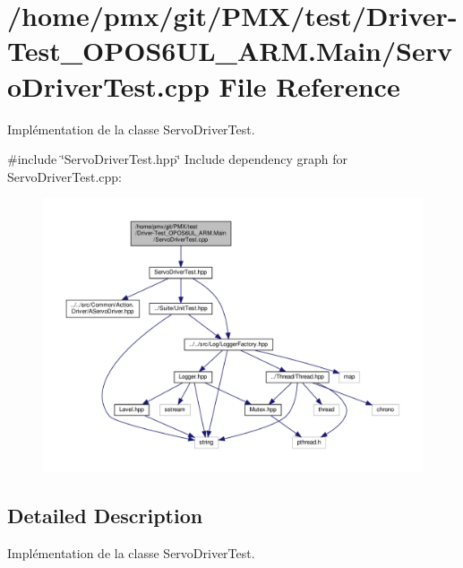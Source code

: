 \hypertarget{Driver-Test__OPOS6UL__ARM_8Main_2ServoDriverTest_8cpp}{}\section{/home/pmx/git/\+P\+M\+X/test/\+Driver-\/\+Test\+\_\+\+O\+P\+O\+S6\+U\+L\+\_\+\+A\+RM.Main/\+Servo\+Driver\+Test.cpp File Reference}
\label{Driver-Test__OPOS6UL__ARM_8Main_2ServoDriverTest_8cpp}


Implémentation de la classe Servo\+Driver\+Test.  


{\ttfamily \#include \char`\"{}Servo\+Driver\+Test.\+hpp\char`\"{}}\newline
Include dependency graph for Servo\+Driver\+Test.\+cpp\+:
\nopagebreak
\begin{figure}[H]
\begin{center}
\leavevmode
\includegraphics[width=350pt]{Driver-Test__OPOS6UL__ARM_8Main_2ServoDriverTest_8cpp__incl}
\end{center}
\end{figure}


\subsection{Detailed Description}
Implémentation de la classe Servo\+Driver\+Test. 

